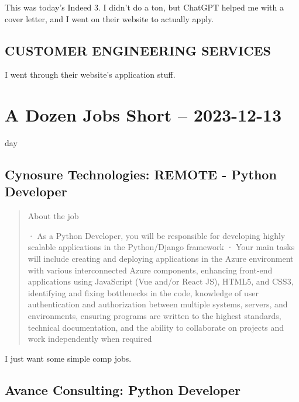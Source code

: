 \documentclass[
	letterpaper, %
	12pt, %
]{CSSullivanBusinessReport}
\begin{document}
This was today's Indeed 3. I didn't do a ton, but ChatGPT helped me with a cover letter, and I went on their website to actually apply. 


\subsection[CUSTOMER ENGINEERING SERVICES]{CUSTOMER ENGINEERING SERVICES}

I went through their website's application stuff. 


\section[13 Dec: A Day Late]{A Dozen Jobs Short -- 2023-12-13} %

day


\subsection[Cynosure Technologies]{Cynosure Technologies: REMOTE - Python Developer}

\begin{quote}
	About the job
	
	· As a Python Developer, you will be responsible for developing highly scalable applications in the Python/Django framework
	· Your main tasks will include creating and deploying applications in the Azure environment with various interconnected Azure components, enhancing front-end applications using JavaScript (Vue and/or React JS), HTML5, and CSS3, identifying and fixing bottlenecks in the code, knowledge of user authentication and authorization between multiple systems, servers, and environments, ensuring programs are written to the highest standards, technical documentation, and the ability to collaborate on projects and work independently when required

\end{quote}

I just want some simple comp jobs.


\subsection[Avance Consulting]{Avance Consulting: Python Developer}
\end{document}
